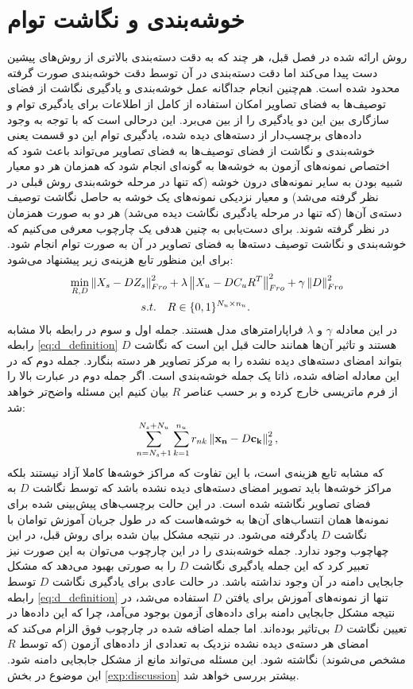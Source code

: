 \section{خوشه‌بندی و نگاشت توام} \label{jeac}
روش ارائه شده در فصل قبل، هر چند که به دقت دسته‌بندی بالاتری از روش‌های پیشین دست پیدا می‌کند اما دقت دسته‌بندی در آن توسط دقت خوشه‌بندی صورت گرفته محدود شده است. هم‌چنین انجام جداگانه عمل خوشه‌بندی و یادگیری نگاشت از فضای توصیف‌ها به فضای تصاویر امکان استفاده از کامل از اطلاعات برای یادگیری توام و سازگاری بین این دو یادگیری را از بین می‌برد. این درحالی است که با توجه به وجود داده‌های برچسب‌دار از دسته‌های دیده شده، یادگیری توام این دو قسمت یعنی خوشه‌بندی و نگاشت از فضای توصیف‌ها به فضای تصاویر می‌تواند باعث شود که اختصاص نمونه‌های آزمون به خوشه‌ها به گونه‌ای انجام شود که همزمان هر دو معیار شبیه بودن به سایر نمونه‌های درون خوشه (که تنها در مرحله خوشه‌بندی روش قبلی در نظر گرفته می‌شد) و معیار نزدیکی نمونه‌های یک خوشه به حاصل نگاشت توصیف دسته‌ی آن‌ها (که تنها در مرحله یادگیری نگاشت دیده می‌شد) هر دو به صورت همزمان در نظر گرفته شوند.
 برای دست‌یابی به چنین هدفی یک چارچوب معرفی می‌کنیم که خوشه‌بندی و نگاشت توصیف دسته‌ها به فضای تصاویر در آن به صورت توام انجام شود.
برای این منظور تابع هزینه‌ی زیر پیشنهاد می‌شود:
\begin{align}
\label{eq:joint}
 \min_{R,D} \left \lVert X_s - D Z_s \right \rVert_{Fro}^2  &+ \lambda \left \lVert X_u - D C_u R^T  \right \rVert_{Fro}^2 + \gamma \left \lVert D \right \rVert_{Fro}^2 \\
   s.t. \quad & R \in \{0,1\}^{N_u \times n_u}. \nonumber
\end{align}
در این معادله $\gamma$ و $\lambda$ فراپارامترهای مدل هستند. جمله اول و سوم در رابطه بالا مشابه رابطه \eqref{eq:d_definition} هستند و تاثیر آن‌ها همانند حالت قبل این است که نگاشت $D$ بتواند امضای دسته‌های دیده نشده را به مرکز تصاویر هر دسته بنگارد. جمله دوم که در این معادله اضافه شده، ذاتا یک جمله خوشه‌بندی است. اگر جمله دوم در عبارت بالا را از فرم ماتریسی خارج کرده و بر حسب عناصر $R$ بیان کنیم این مسئله واضح‌تر  خواهد شد:
\begin{equation}
\label{eq:essentialy_clustering}
\sum_{n=N_s+1}^{N_s + N_u} \sum_{k=1}^{n_u} r_{nk} \left \lVert \mathbf{x_n} - D \mathbf{c_k} \right \rVert_2^2,
\end{equation}
که مشابه تابع هزینه‌ی
است، با این تفاوت که مراکز خوشه‌ها کاملا آزاد نیستند بلکه مراکز خوشه‌ها باید تصویر امضای دسته‌های دیده نشده باشد که توسط نگاشت $D$ به فضای تصاویر نگاشته شده است. در این حالت برچسب‌های پیش‌بینی شده برای نمونه‌ها همان انتساب‌های آن‌ها به خوشه‌هاست که در طول جریان آموزش توامان با نگاشت $D$ یادگرفته می‌شود. در نتیجه مشکل بیان شده برای روش قبل، در این چهاچوب وجود ندارد. جمله خوشه‌بندی را در این چارچوب می‌توان به این صورت نیز تعبیر کرد که این جمله یادگیری نگاشت $D$ را به صورتی بهبود می‌دهد که مشکل جابجایی دامنه در آن وجود نداشته باشد. در حالت عادی برای یادگیری نگاشت $D$ توسط رابطه
\eqref{eq:d_definition}
تنها از نمونه‌های آموزش برای یافتن $D$ استفاده می‌شد، در نتیجه مشکل جابجایی دامنه برای داده‌های آزمون بوجود می‌آمد، چرا که این داده‌ها در تعیین نگاشت $D$ بی‌تاثیر بوده‌اند. اما جمله اضافه شده در چارچوب فوق الزام می‌کند که امضای هر دسته‌ی دیده نشده نزدیک به تعدادی از داده‌های آزمون (که توسط $R$ مشخص می‌شوند) نگاشته شود. این مسئله می‌تواند مانع از مشکل جابجایی دامنه شود. این موضوع در بخش
\ref{exp:discussion}
بیشتر بررسی خواهد شد.

